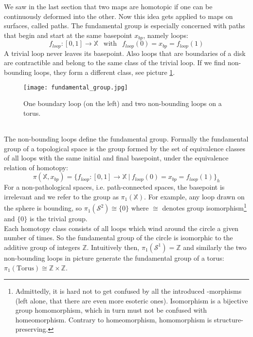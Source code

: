 We saw in the last section that two maps are homotopic if one can be continuously deformed into the other.
Now this idea gets applied to maps on surfaces, called paths.
The fundamental group is especially concerned with paths that begin and start at the same basepoint $x_{bp}$, namely loops:
\begin{equation}
	f_{loop}: [0,1] \rightarrow \mathbb{X} ~~ \text{ with }~~ f_{loop}(0) = x_{bp} = f_{loop}(1)
\end{equation}
A trivial loop never leaves its basepoint.
Also loops that are boundaries of a disk are contractible and belong to the same class of the trivial loop.
If we find non-bounding loops, they form a different class, see picture \ref{fig:fundamental_group_torus}.
\begin{figure}[htb]
\centering
\texttt{[image: fundamental\_group.jpg]}
\caption{One boundary loop (on the left) and two non-bounding loops on a torus.}
\label{fig:fundamental_group_torus}
\end{figure}\\
The non-bounding loops define the fundamental group.
Formally the fundamental group of a topological space is the group formed by the set of equivalence classes of all loops with the same initial and final basepoint, under the equivalence relation of homotopy:
\begin{equation}
	\pi(\mathbb{X}, x_{bp}) = \{ f_{loop}: [0,1] \rightarrow \mathbb{X} ~|~ f_{loop}(0) = x_{bp} = f_{loop}(1)\}_{h}
\end{equation}
For a non-pathological spaces, i.e. path-connected spaces, the basepoint is irrelevant and we refer to the group as $\pi_{1}(\mathbb{X})$.
For example, any loop drawn on the sphere is bounding, so $\pi_{1}(\mathcal{S}^{2}) \cong \{0\}$ where $\cong$ denotes group isomorphism\footnote{ Admittedly, it is hard not to get confused by all the introduced -morphisms (left alone, that there are even more esoteric ones). Isomorphism is a bijective group homomorphism, which in turn must not be confused with homeomorphism. Contrary to homeomorphism, homomorphism is structure-preserving.} and $\{0\}$ is the trivial group.\\
Each homotopy class consists of all loops which wind around the circle a given number of times.
So the fundamental group of the circle is isomorphic to the additive group of integers $\mathbb{Z}$.
Intuitively then, $\pi_{1}(\mathcal{S}^{1}) = \mathbb{Z}$ and similarly the two non-bounding loops in picture \label{fig:fundamental_group} generate the fundamental group of a torus: $\pi_{1}(\text{Torus}) \cong \mathbb{Z} \times \mathbb{Z}$.\\
